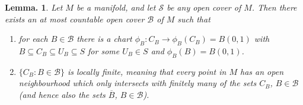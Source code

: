 \documentclass[11pt, a4paper]{memoir}
\theoremstyle{change}
\newtheorem{lemma}[theorem]{Lemma.}
\theoremstyle{plain}
\theoremstyle{nonumberplain}
\numberwithin{equation}{section}
\begin{document}
\begin{lemma}
    Let $M$ be a manifold, and let $\mathcal{S}$ be any open cover of $M$.
    Then there exists an at most countable open cover $\mathcal{B}$ of $M$ such that
    \begin{enumerate}[nl]
        \item for each $B\in\mathcal{B}$ there is a chart $\phi_B:C_B\to\phi_B(C_B)=B(0,1)$ with $B\subseteq C_B\subseteq U_B\subseteq S$ for some $U_B\in S$ and $\phi_B(B)=B(0,1)$.
        \item $\{C_B:B\in\mathcal{B}\}$ is locally finite, meaning that every point in $M$ has an open neighbourhood which only intersects with finitely many of the sets $C_B$, $B\in\mathcal{B}$ (and hence also the sets $\overline{B}$, $B\in\mathcal{B}$).
    \end{enumerate}
\end{lemma}
\end{document}
